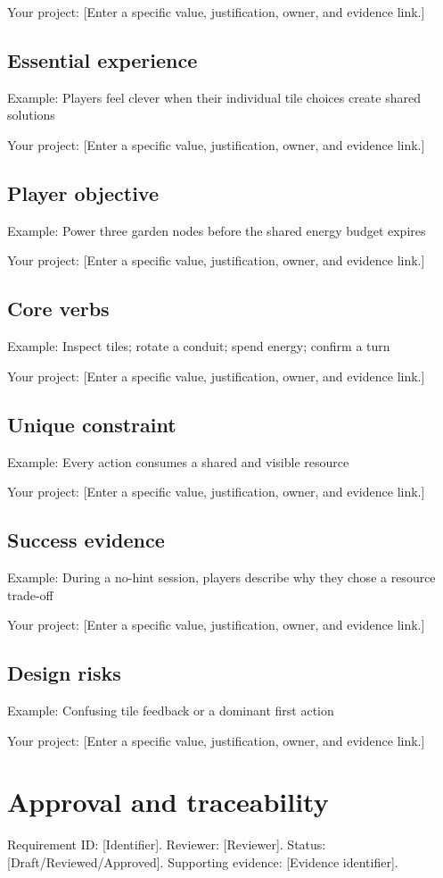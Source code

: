 \documentclass[11pt]{article}
\begin{document}
Your project: [Enter a specific value, justification, owner, and evidence link.]


\subsection{Essential experience}
Example: Players feel clever when their individual tile choices create shared solutions

Your project: [Enter a specific value, justification, owner, and evidence link.]


\subsection{Player objective}
Example: Power three garden nodes before the shared energy budget expires

Your project: [Enter a specific value, justification, owner, and evidence link.]


\subsection{Core verbs}
Example: Inspect tiles; rotate a conduit; spend energy; confirm a turn

Your project: [Enter a specific value, justification, owner, and evidence link.]


\subsection{Unique constraint}
Example: Every action consumes a shared and visible resource

Your project: [Enter a specific value, justification, owner, and evidence link.]


\subsection{Success evidence}
Example: During a no-hint session, players describe why they chose a resource trade-off

Your project: [Enter a specific value, justification, owner, and evidence link.]


\subsection{Design risks}
Example: Confusing tile feedback or a dominant first action

Your project: [Enter a specific value, justification, owner, and evidence link.]


\section{Approval and traceability}
Requirement ID: [Identifier]. Reviewer: [Reviewer]. Status: [Draft/Reviewed/Approved]. Supporting evidence: [Evidence identifier].
\end{document}
